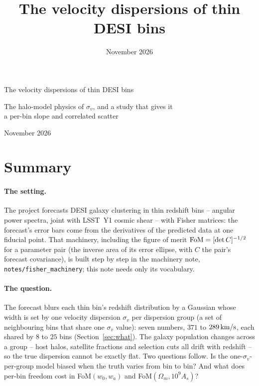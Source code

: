 \documentclass[11pt]{article}
\title{The velocity dispersions of thin DESI bins}
\date{November 2026}
\author{}
\newcommand{\sv}{\sigma_v}
\newcommand{\kms}{\,{\rm km/s}}
\newcommand{\us}{\_\allowbreak}
\begin{document}
\begin{center}
  {\LARGE The velocity dispersions of thin DESI bins\par}
  \vspace{0.4em}
  {\large The halo-model physics of $\sv$, and a study that gives it\\
    a per-bin slope and correlated scatter\par}
  \vspace{0.6em}
  {\large November 2026\par}
\end{center}
\vspace{1em}

\section{Summary}
\label{sec:summary}

\paragraph{The setting.}
The project forecasts DESI galaxy clustering in thin redshift bins --
angular power spectra, joint with LSST~Y1 cosmic shear -- with Fisher
matrices: the forecast's error bars come from the derivatives of the
predicted data at one fiducial point.  That machinery, including the
figure of merit ${\rm FoM} = [\det C]^{-1/2}$ for a parameter pair
(the inverse area of its error ellipse, with $C$ the pair's forecast
covariance), is built step by step in the machinery note,
\texttt{notes/fisher\us machinery}; this note needs only its
vocabulary.

\paragraph{The question.}
The forecast blurs each thin bin's redshift distribution by a Gaussian
whose width is set by one velocity dispersion $\sv$ per dispersion
group (a set of neighbouring bins that share one $\sv$ value): seven
numbers, $371$ to $289\kms$, each shared by $8$ to $25$
bins (Section~\ref{sec:what}).  The galaxy population changes across a
group -- host halos, satellite fractions and selection cuts all drift
with redshift -- so the true dispersion cannot be exactly flat.  Two
questions follow.  Is the one-$\sv$-per-group model biased when the
truth varies from bin to bin?  And what does per-bin freedom cost in
FoM$(w_0, w_a)$ and FoM$(\Omega_m, 10^9 A_s)$?
\end{document}
